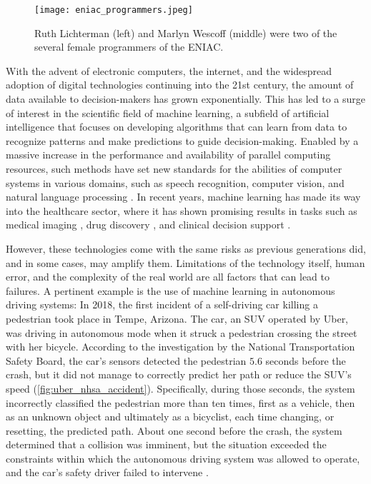 \begin{figure}[t]
    \centering
    \texttt{[image: eniac\_programmers.jpeg]}
    \caption{Ruth Lichterman (left) and Marlyn Wescoff (middle) were two of the several female programmers of the ENIAC. \cite[photo credit]{usarmyresearchlaboratoryarltechnicallibrary_female_1940}} %
    \label{fig:eniac_programmers}
\end{figure}

With the advent of electronic computers, the internet, and the widespread adoption of digital technologies continuing into the 21st century, the amount of data available to decision-makers has grown exponentially. 
This has led to a surge of interest in the scientific field of machine learning, a subfield of artificial intelligence that focuses on developing algorithms that can learn from data to recognize patterns and make predictions to guide decision-making. 
Enabled by a massive increase in the performance and availability of parallel computing resources, such methods have set new standards for the abilities of computer systems in various domains, such as speech recognition, computer vision, and natural language processing \cite{lecun_deep_2015}. 
In recent years, machine learning has made its way into the healthcare sector, where it has shown promising results in tasks such as medical imaging \cite{lundervold_overview_2019}, drug discovery \cite{chen_rise_2018}, and clinical decision support \cite{cite15, cite14}. 

However, these technologies come with the same risks as previous generations did, and in some cases, may amplify them. 
Limitations of the technology itself, human error, and the complexity of the real world are all factors that can lead to failures. A pertinent example is the use of machine learning in autonomous driving systems: 
In 2018, the first incident of a self-driving car killing a pedestrian took place in Tempe, Arizona. 
The car, an SUV operated by Uber, was driving in autonomous mode when it struck a pedestrian crossing the street with her bicycle. 
According to the investigation by the National Transportation Safety Board, the car's sensors detected the pedestrian $5.6$ seconds before the crash, but it did not manage to correctly predict her path or reduce the SUV's speed (\cref{fig:uber_nhsa_accident}). 
Specifically, during those seconds, the system incorrectly classified the pedestrian more than ten times, first as a vehicle, then as an unknown object and ultimately as a bicyclist, each time changing, or resetting, the predicted path. 
About one second before the crash, the system determined that a collision was imminent, but the situation exceeded the constraints within which the autonomous driving system was allowed to operate, and the car's safety driver failed to intervene \cite{nationaltransportationsafetyboardnhsa_collision_2019}. 

